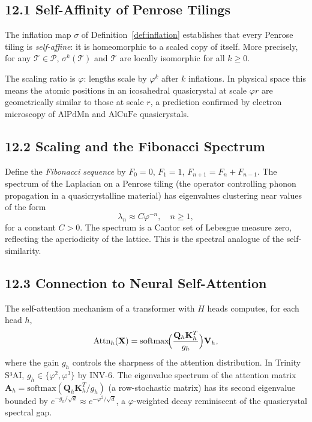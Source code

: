 \subsection{12.1 Self-Affinity of Penrose
Tilings}\label{sec:self-affinity}

The inflation map \(\sigma\) of
Definition~\ref{def:inflation} establishes that
every Penrose tiling is \emph{self-affine}: it is
homeomorphic to a scaled copy of itself. More
precisely, for any \(\mathcal{T} \in \mathcal{P}\),
\(\sigma^k(\mathcal{T})\) and \(\mathcal{T}\)
are locally isomorphic for all \(k \geq 0\).

The scaling ratio is \(\varphi\): lengths scale
by \(\varphi^k\) after \(k\) inflations. In
physical space this means the atomic positions in
an icosahedral quasicrystal at scale \(\varphi r\)
are geometrically similar to those at scale \(r\),
a prediction confirmed by electron microscopy of
\(\text{AlPdMn}\) and \(\text{AlCuFe}\)
quasicrystals.

\subsection{12.2 Scaling and the Fibonacci
Spectrum}\label{sec:fibonacci-spectrum}

Define the \emph{Fibonacci sequence} by \(F_0 = 0\),
\(F_1 = 1\), \(F_{n+1} = F_n + F_{n-1}\). The
spectrum of the Laplacian on a Penrose tiling
(the operator controlling phonon propagation in
a quasicrystalline material) has eigenvalues
clustering near values of the form
\[
  \lambda_n \approx C \varphi^{-n}, \quad n \geq 1,
\]
for a constant \(C > 0\). The spectrum is a
Cantor set of Lebesgue measure zero, reflecting
the aperiodicity of the lattice. This is the
spectral analogue of the self-similarity.

\subsection{12.3 Connection to Neural
Self-Attention}\label{sec:nn-selfattention}

The self-attention mechanism of a transformer
with \(H\) heads computes, for each head \(h\),
\[
  \text{Attn}_h(\mathbf{X}) =
    \text{softmax}\!\Bigl(
      \frac{\mathbf{Q}_h \mathbf{K}_h^T}{g_h}
    \Bigr) \mathbf{V}_h,
\]
where the gain \(g_h\) controls the sharpness of
the attention distribution. In Trinity S³AI,
\(g_h \in \{\varphi^2, \varphi^3\}\) by INV-6.
The eigenvalue spectrum of the attention matrix
\(\mathbf{A}_h = \text{softmax}(\mathbf{Q}_h
\mathbf{K}_h^T / g_h)\) (a row-stochastic matrix)
has its second eigenvalue bounded by
\(e^{-g_h / \sqrt{d}} \approx e^{-\varphi^2/\sqrt{d}}\),
a \(\varphi\)-weighted decay reminiscent of the
quasicrystal spectral gap.


